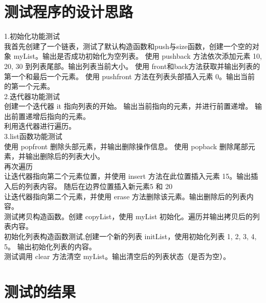 \documentclass[UTF8]{ctexart}
\begin{document}
\pagestyle{fancy}
\fancyhead{}

\section{测试程序的设计思路}

\LARGE{1.初始化功能测试} \\
\large{}
我首先创建了一个链表，测试了默认构造函数和push与size函数，创建一个空的对象 myList。输出是否成功初始化为空列表。
使用 pushback 方法依次添加元素 10, 20, 30 到列表尾部。输出列表当前大小。
使用 front和back方法获取并输出列表的第一个和最后一个元素。
使用 pushfront 方法在列表头部插入元素 0。输出当前的第一个元素。\\
\LARGE{2.迭代器功能测试} \\ 
\large{}
创建一个迭代器 it 指向列表的开始。
输出当前指向的元素，并进行前置递增。
输出前置递增后指向的元素。\\ 
利用迭代器进行遍历。\\ 
\LARGE{3.list函数功能测试} \large{}\\ 
使用 popfront 删除头部元素，并输出删除操作信息。
使用 popback 删除尾部元素，并输出删除后的列表大小。\\ 
再次遍历\\ 
让迭代器指向第二个元素位置，并使用 insert 方法在此位置插入元素 15。输出插入后的列表内容。
随后在边界位置插入新元素5 和 20\\ 
让迭代器指向第二个元素，并使用 erase 方法删除该元素。输出删除后的列表内容。\\ 
测试拷贝构造函数。创建 copyList，使用 myList 初始化。遍历并输出拷贝后的列表内容。\\ 
初始化列表构造函数测试,创建一个新的列表 initList，使用初始化列表 {1, 2, 3, 4, 5}。
输出初始化列表的内容。\\ 
测试调用 clear 方法清空 myList。输出清空后的列表状态（是否为空）。



\section{测试的结果}
\end{document}
